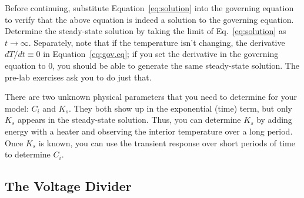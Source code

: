 \documentclass[11pt]{article} %
\begin{document}
Before continuing, substitute Equation~\ref{eq:solution} into the governing equation to verify that the above equation is indeed a solution to the governing equation. Determine the steady-state solution by taking the limit of Eq.~\ref{eq:solution} as $t\rightarrow \infty$. Separately, note that if the temperature isn’t changing, the derivative $dT/dt\equiv 0$ in Equation~\ref{eq:gov.eq}; if you set the derivative in the governing equation to 0, you should be able to generate the same steady-state solution. The pre-lab exercises ask you to do just that.

There are two unknown physical parameters that you need to determine for your model: $C_{i}$ and $K_s$. They both show up in the exponential (time) term, but only $K_s$ appears in the steady-state solution. Thus, you can determine $K_s$ by adding energy with a heater and observing the interior temperature over a long period. Once $K_s$ is known, you can use the transient response over short periods of time to determine $C_{i}$. 

\subsection{The Voltage Divider}
\end{document}
